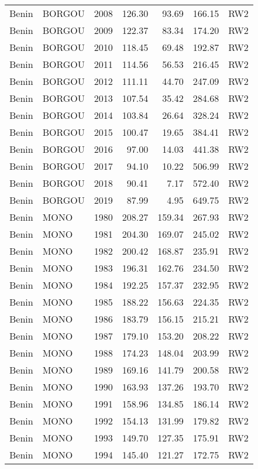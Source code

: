 \begin{longtable}{lllrrrl}
  Benin & BORGOU & 2008 & 126.30 & 93.69 & 166.15 & RW2 \\ 
  Benin & BORGOU & 2009 & 122.37 & 83.34 & 174.20 & RW2 \\ 
  Benin & BORGOU & 2010 & 118.45 & 69.48 & 192.87 & RW2 \\ 
  Benin & BORGOU & 2011 & 114.56 & 56.53 & 216.45 & RW2 \\ 
  Benin & BORGOU & 2012 & 111.11 & 44.70 & 247.09 & RW2 \\ 
  Benin & BORGOU & 2013 & 107.54 & 35.42 & 284.68 & RW2 \\ 
  Benin & BORGOU & 2014 & 103.84 & 26.64 & 328.24 & RW2 \\ 
  Benin & BORGOU & 2015 & 100.47 & 19.65 & 384.41 & RW2 \\ 
  Benin & BORGOU & 2016 & 97.00 & 14.03 & 441.38 & RW2 \\ 
  Benin & BORGOU & 2017 & 94.10 & 10.22 & 506.99 & RW2 \\ 
  Benin & BORGOU & 2018 & 90.41 & 7.17 & 572.40 & RW2 \\ 
  Benin & BORGOU & 2019 & 87.99 & 4.95 & 649.75 & RW2 \\ 
  Benin & MONO & 1980 & 208.27 & 159.34 & 267.93 & RW2 \\ 
  Benin & MONO & 1981 & 204.30 & 169.07 & 245.02 & RW2 \\ 
  Benin & MONO & 1982 & 200.42 & 168.87 & 235.91 & RW2 \\ 
  Benin & MONO & 1983 & 196.31 & 162.76 & 234.50 & RW2 \\ 
  Benin & MONO & 1984 & 192.25 & 157.37 & 232.95 & RW2 \\ 
  Benin & MONO & 1985 & 188.22 & 156.63 & 224.35 & RW2 \\ 
  Benin & MONO & 1986 & 183.79 & 156.15 & 215.21 & RW2 \\ 
  Benin & MONO & 1987 & 179.10 & 153.20 & 208.22 & RW2 \\ 
  Benin & MONO & 1988 & 174.23 & 148.04 & 203.99 & RW2 \\ 
  Benin & MONO & 1989 & 169.16 & 141.79 & 200.58 & RW2 \\ 
  Benin & MONO & 1990 & 163.93 & 137.26 & 193.70 & RW2 \\ 
  Benin & MONO & 1991 & 158.96 & 134.85 & 186.14 & RW2 \\ 
  Benin & MONO & 1992 & 154.13 & 131.99 & 179.82 & RW2 \\ 
  Benin & MONO & 1993 & 149.70 & 127.35 & 175.91 & RW2 \\ 
  Benin & MONO & 1994 & 145.40 & 121.27 & 172.75 & RW2 \\ 

\end{longtable}
